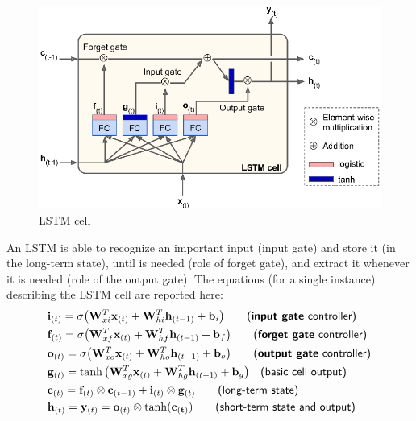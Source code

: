\vspace{-0.3cm}
\begin{figure}[H]
    \centering
    \includegraphics[scale=0.7]{img/LSTM.png}
    \caption{LSTM cell}
\end{figure}
\vspace{-0.3cm}
\noindent
An LSTM is able to recognize an important input (input gate) and store it (in the long-term state), until is needed (role of forget gate), and extract it whenever it is needed (role of the output gate). The equations (for a single instance) describing the LSTM cell are reported here: 
\begin{align}
    &\mathbf{i}_{(t)} = \sigma\big(
        \mathbf{W}_{xi}^T \mathbf{x}_{(t)}+
        \mathbf{W}_{hi}^T \mathbf{h}_{(t-1)} + \mathbf{b}_i    
    \big) \qquad \textsf{(\textbf{input gate} controller)}\\
    &\mathbf{f}_{(t)} = \sigma\big(
        \mathbf{W}_{xf}^T \mathbf{x}_{(t)}+
        \mathbf{W}_{hf}^T \mathbf{h}_{(t-1)} + \mathbf{b}_f    
    \big) \qquad \textsf{(\textbf{forget gate} controller)} \\
    &\mathbf{o}_{(t)} = \sigma\big(
        \mathbf{W}_{xo}^T \mathbf{x}_{(t)}+
        \mathbf{W}_{ho}^T \mathbf{h}_{(t-1)} + \mathbf{b}_o    
    \big) \qquad \textsf{(\textbf{output gate} controller)}\\
    &\mathbf{g}_{(t)} = \tanh\big(
        \mathbf{W}_{xg}^T \mathbf{x}_{(t)}+
        \mathbf{W}_{hg}^T \mathbf{h}_{(t-1)} + \mathbf{b}_g    
    \big) \quad \textsf{(basic cell output)}\\
    &\mathbf{c}_{(t)}= \mathbf{f}_{(t)} \otimes \mathbf{c}_{(t-1)} + \mathbf{i}_{(t)}\otimes \mathbf{g}_{(t)} \qquad \textsf{(long-term state)}\\
    &\mathbf{h}_{(t)}=\mathbf{y}_{(t)}=\mathbf{o}_{(t)} \otimes \tanh(\mathbf{c_{(t)}}) \qquad \textsf{(short-term state and output)}
\end{align}

